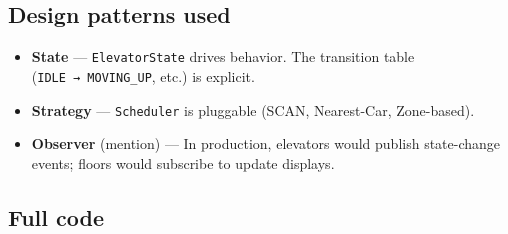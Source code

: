\documentclass[11pt]{article}
\providecommand{\tightlist}{\setlength{\itemsep}{1pt}\setlength{\parskip}{0pt}}
\begin{document}
\subsection{Design patterns used}\label{design-patterns-used-4}

\begin{itemize}
\tightlist
\item
  \textbf{State} --- \texttt{ElevatorState} drives behavior. The transition table (\texttt{IDLE\ →\ MOVING\_UP}, etc.) is explicit.
\item
  \textbf{Strategy} --- \texttt{Scheduler} is pluggable (SCAN, Nearest-Car, Zone-based).
\item
  \textbf{Observer} (mention) --- In production, elevators would publish state-change events; floors would subscribe to update displays.
\end{itemize}


\subsection{Full code}\label{full-code-4}

\end{document}
